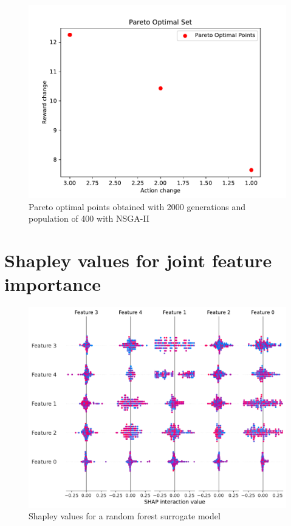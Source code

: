\documentclass[UKenglish]{uiomasterthesis}
\begin{document}
\begin{figure}[!ht]
	\includegraphics[width=\columnwidth]{images/best_counterfactuals_with_model.pdf}
	\caption{Pareto optimal points obtained with 2000 generations and population of 400 with NSGA-II}
	\label{fig:pareto_model} 
\end{figure}

\section{Shapley values for joint feature importance}

\begin{figure}[!ht]
	\includegraphics[width=\columnwidth]{images/shap_plot_surrogate.pdf}
	\caption{Shapley values for a random forest surrogate model}
	\label{fig:shap} 
\end{figure}
\end{document}
